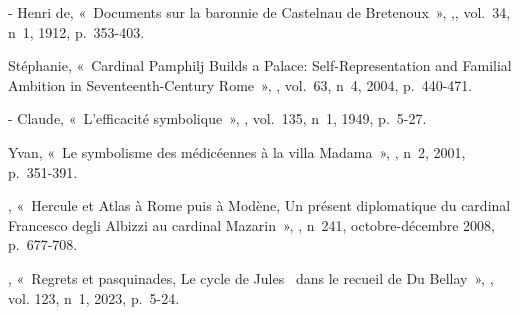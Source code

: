 \begin{teiElement}[name={TEI},change={commons\_edition}]
\begin{teiElement}[name={text},type={book},xmlid={book}]
\begin{teiElement}[name={group},type={book},xmlid={book-001}]
\begin{teiElement}[name={group},type={bibliography},data-page-title={Sources et bibliographie},data-include-href={Ch14\_Source\_bibliographie.xml},xmlid={bibliography-001}]
\begin{teiElement}[name={body}]
\begin{teiDiv}[type={section1},xmlid={div18}]
\begin{teiDiv}[type={section2},xmlid={div20}]
\begin{teiBibl}[xmlid={bibl-462}]
\end{teiBibl}
              \begin{teiBibl}[xmlid={bibl-463}]
- Henri de, « Documents sur la baronnie de Castelnau de Bretenoux », ,, vol. 34, n 1, 1912, p. 353-403.
\end{teiBibl}
              \begin{teiBibl}[xmlid={bibl-464}]
 Stéphanie, « Cardinal Pamphilj Builds a Palace: Self-Representation and Familial Ambition in Seventeenth-Century Rome », , vol. 63, n 4, 2004, p. 440-471.
\end{teiBibl}
              \begin{teiBibl}[xmlid={bibl-465}]
- Claude, « L’efficacité symbolique », , vol. 135, n 1, 1949, p. 5-27.
\end{teiBibl}
              \begin{teiBibl}[xmlid={bibl-466}]
 Yvan, « Le symbolisme des  médicéennes à la villa Madama », , n 2, 2001, p. 351-391.
\end{teiBibl}
              \begin{teiBibl}[xmlid={bibl-467}]
, « Hercule et Atlas à Rome puis à Modène, Un présent diplomatique du cardinal Francesco degli Albizzi au cardinal Mazarin », , n 241, octobre-décembre 2008, p. 677-708.
\end{teiBibl}
              \begin{teiBibl}[xmlid={bibl-468}]
, « Regrets et pasquinades, Le cycle de Jules  dans le recueil de Du Bellay », , vol. 123, n 1, 2023, p. 5-24.
\end{teiBibl}
              \begin{teiBibl}[xmlid={bibl-469}]

\end{teiBibl}
\end{teiDiv}
\end{teiDiv}
\end{teiElement}
\end{teiElement}
\end{teiElement}
\end{teiElement}
\end{teiElement}
